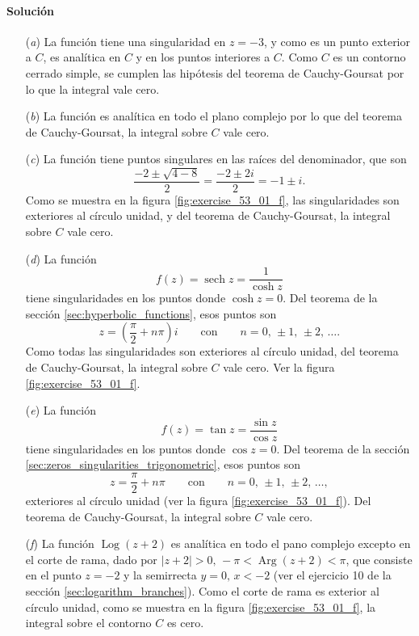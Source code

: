 \documentclass[a4paper]{report}
\DeclareMathOperator{\Arg}{Arg}
\DeclareMathOperator{\Log}{Log}
\DeclareMathOperator{\sech}{sech}
\begin{document}
\paragraph{Solución} 
\begin{enumerate}
 \item[(\textit{a})] La función tiene una singularidad en \(z=-3\), y como es un punto exterior a \(C\), es analítica en \(C\) y en los puntos interiores a \(C\). Como \(C\) es un contorno cerrado simple, se cumplen las hipótesis del teorema de Cauchy-Goursat por lo que la integral vale cero.
 \item[(\textit{b})] La función es analítica en todo el plano complejo por lo que del teorema de Cauchy-Goursat, la integral sobre \(C\) vale cero.
 \item[(\textit{c})] La función tiene puntos singulares en las raíces del denominador, que son
 \[
  \frac{-2\pm\sqrt{4-8}}{2}=\frac{-2\pm2i}{2}=-1\pm i.
 \]
 Como se muestra en la figura \ref{fig:exercise_53_01_f}, las singularidades son exteriores al círculo unidad, y del teorema de Cauchy-Goursat, la integral sobre \(C\) vale cero.
 \item[(\textit{d})] La función
 \[
  f(z)=\sech z=\frac{1}{\cosh z}
 \]
 tiene singularidades en los puntos donde \(\cosh z=0\). Del teorema de la sección \ref{sec:hyperbolic_functions}, esos puntos son
 \[
  z=\left(\frac{\pi}{2}+n\pi\right)i
  \qquad\textrm{con}\qquad 
  n=0,\,\pm1,\,\pm2,\,\dots.
 \]
 Como todas las singularidades son exteriores al círculo unidad, del teorema de Cauchy-Goursat, la integral sobre \(C\) vale cero. Ver la figura \ref{fig:exercise_53_01_f}.
 \item[(\textit{e})] La función
 \[
  f(z)=\tan z=\frac{\sin z}{\cos z}
 \]
 tiene singularidades en los puntos donde \(\cos z=0\). Del teorema de la sección  \ref{sec:zeros_singularities_trigonometric}, esos puntos son
 \[
  z=\frac{\pi}{2}+n\pi
  \qquad\textrm{con}\qquad 
  n=0,\,\pm1,\,\pm2,\,\dots,
 \]
 exteriores al círculo unidad (ver la figura \ref{fig:exercise_53_01_f}). Del teorema de Cauchy-Goursat, la integral sobre \(C\) vale cero.
 \item[(\textit{f})] La función \(\Log(z+2)\) es analítica en todo el pano complejo excepto en el corte de rama, dado por \(|z+2|>0,\,-\pi<\Arg(z+2)<\pi\), que consiste en el punto \(z=-2\) y la semirrecta \(y=0,\,x<-2\) (ver el ejercicio 10 de la sección \ref{sec:logarithm_branches}). Como el corte de rama es exterior al círculo unidad, como se muestra en la figura \ref{fig:exercise_53_01_f}, la integral sobre el contorno \(C\) es cero.
\end{enumerate}
\end{document}
